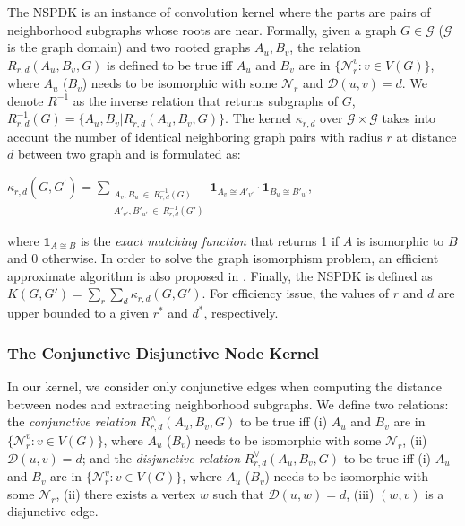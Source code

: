 \documentclass{esannV2}
\begin{document}
The NSPDK is an instance of convolution kernel where the parts are pairs of
neighborhood subgraphs whose roots are near. Formally, given a graph $G \in
\mathcal{G}$ ($\mathcal{G}$ is the graph domain) and two rooted graphs $A_u,
B_v$, the relation $R_{r,d}(A_u, B_v, G)$ is defined to be true iff $A_u$ and
$B_v$ are in $\lbrace \mathcal{N}_r^v: v \in V(G) \rbrace$, where $A_u$
($B_v$) needs to be isomorphic with some $\mathcal{N}_r$ and
$\mathcal{D}(u,v)= d$. We denote $R^{-1}$ as the inverse relation that returns
subgraphs of $G$, $R^{-1}_{r,d}(G) = \lbrace A_u, B_v |
R_{r,d}(A_u,B_v,G)\rbrace$. The kernel $\kappa_{r,d}$ over $\mathcal{G} \times
\mathcal{G}$ takes into account the number of identical neighboring graph
pairs with radius $r$ at distance $d$ between two graph and is formulated as:
\begin{center}  $\kappa_{r,d}(G,G^{'}) = \!\!\!\!\!\!\!\!\!\!\!\!
\sum\limits_{\substack{A_v, B_u \ \in \ R_{r,d}^{-1}(G) \\ {A'}_{v'},
{B'}_{u'} \ \in \ R_{r,d}^{-1}(G') }} \!\!\!\!\!\!\!\!\!\!\!\!  { {
\textbf{1}_{A_{v} \cong A'_{v'}}} \cdot { \textbf{1}_{B_{u} \cong B'_{u'}}}
}$, \end{center} where $\textbf{1}_{A \cong B}$ is the \textit{exact matching
function} that returns 1 if $A$ is isomorphic to $B$ and 0 otherwise. In order
to solve the graph isomorphism problem, an efficient approximate algorithm is
also proposed in \cite{nspdk}. Finally, the NSPDK is defined as $K(G,G') =
\sum\limits_{r}{\sum\limits_{d}{\kappa_{r,d}(G,G')}}$. For efficiency issue,
the values of $r$ and $d$ are upper bounded to a given $r^*$ and $d^*$,
respectively.

\subsubsection{The Conjunctive Disjunctive Node Kernel}

In our kernel, we consider only conjunctive edges when computing the distance
between nodes and extracting neighborhood subgraphs. We define two relations:
the \textit{conjunctive relation} $R^{\wedge}_{r,d}(A_u, B_v, G)$ to be true
iff (i) $A_u$ and $B_v$ are in $\lbrace \mathcal{N}_r^v: v \in V(G) \rbrace$,
where $A_u$ ($B_v$) needs to be isomorphic with some $\mathcal{N}_r$, (ii)
$\mathcal{D}(u,v)= d$; and the \textit{disjunctive relation}
$R_{r,d}^{\vee}(A_u, B_v, G)$ to be true iff (i) $A_u$ and $B_v$ are in
$\lbrace \mathcal{N}_r^v: v \in V(G) \rbrace$, where $A_u$ ($B_v$) needs to be
isomorphic with some $\mathcal{N}_r$,  (ii) there exists a vertex $w$ such
that $\mathcal{D}(u,w)= d$, (iii) $(w,v)$ is a disjunctive edge.
\end{document}
